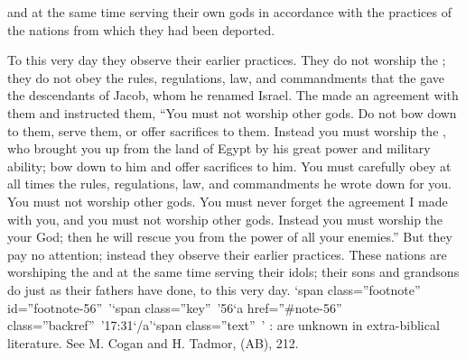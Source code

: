 {{}
and at the same
time
serving
their own gods
in accordance with the practices
of the nations
from which
they had been deported.
\par }{\PP {}To
this
very
day
they
observe
their earlier
practices.
They do not
worship
the {}; they do
not
obey
the rules,
regulations,
law,
and commandments
that
the {}
gave
the descendants
of Jacob,
whom
he renamed
Israel.
The
{}
made
an agreement
with
them and instructed
them, “You must not
worship
other
gods.
Do not
bow
down to them, serve
them, or
offer sacrifices to them.
Instead
you must worship
the {}, who
brought you up
from the land
of Egypt
by his great
power
and military
ability;
bow
down to him and offer sacrifices to him.
You must carefully
obey
at
all
times
the rules,
regulations,
law,
and commandments
he wrote
down for you. You must not
worship
other
gods.
You must never
forget
the agreement
I made
with
you, and you must not
worship
other
gods.
Instead
you must worship
the {}
your God;
then he
will rescue
you from the power
of all
your enemies.”
But they pay no
attention;
instead
they
observe
their earlier
practices.
These
nations
are worshiping
the {}
and at the same time serving
their idols;
their sons
and grandsons
do
just
as their
fathers
have done,
to this very
day. ‘span class=”footnote” id=”footnote-56” ’‘span class=”key” ’56‘a href=”\#note-56” class=”backref” ’17:31‘/a’‘span class=”text” ’
{}:
{} are unknown in extra-biblical literature. See M. Cogan and H. Tadmor,
{} (AB), 212.

}
